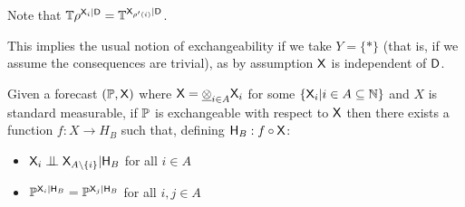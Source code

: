 Note that $\mathbb{T}\rho^{\mathsf{X}_i|\mathsf{D}} = \mathbb{T}^{\mathsf{X}_{\rho'(i)}|\mathsf{D}}$.

This implies the usual notion of exchangeability if we take $Y=\{*\}$ (that is, if we assume the consequences are trivial), as by assumption $\mathsf{X}$ is independent of $\mathsf{D}$.

\begin{lemma}\label{lem:partial_representation}
Given a forecast $(\mathbb{P},\mathsf{X})$ where $\mathsf{X}=\underline{\otimes}_{i\in A} \mathsf{X}_i$ for some $\{\mathsf{X}_i|i\in A\subseteq\mathbb{N}\}$ and $X$ is standard measurable, if $\mathbb{P}$ is exchangeable with respect to $\mathsf{X}$ then there exists a function $f:X\to H_B$ such that, defining $\mathsf{H}_B:f\circ \mathsf{X}$:
    \begin{itemize}
        \item $\RV{X}_i\CI\RV{X}_{A\setminus\{i\}}|\RV{H}_B$ for all $i\in A$
        \item $\mathbb{P}^{\mathsf{X}_i|\mathsf{H}_B}=\mathbb{P}^{\mathsf{X}_j|\mathsf{H}_B}$ for all $i,j\in A$
    \end{itemize}
\end{lemma}

